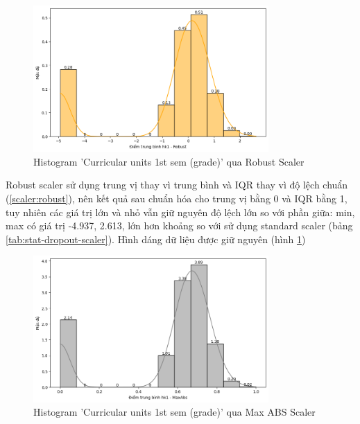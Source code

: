     \begin{figure}[htp]
        \centering
        \includegraphics[width=0.80\textwidth]{images/Table_Dropout_Grade_Robust.png}
        \caption{Histogram 'Curricular units 1st sem (grade)' qua Robust Scaler}
        \label{fig:Table_Dropout_Grade_Robust}
    \end{figure}

    \FloatBarrier

    Robust scaler sử dụng trung vị thay vì trung bình và IQR thay vì độ lệch chuẩn (\ref{scaler:robust}), nên kết quả sau chuẩn hóa cho trung vị bằng 0 và IQR bằng 1, tuy nhiên các giá trị lớn và nhỏ vẫn giữ nguyên độ lệch lớn so với phần giữa: min, max có giá trị -4.937, 2.613, lớn hơn khoảng so với sử dụng standard scaler (bảng \ref{tab:stat-dropout-scaler}). Hình dáng dữ liệu được giữ nguyên (hình \ref{fig:Table_Dropout_Grade_Robust})

    \begin{figure}[htp]
        \centering
        \includegraphics[width=0.80\textwidth]{images/Table_Dropout_Grade_MaxABS.png}
        \caption{Histogram 'Curricular units 1st sem (grade)' qua Max ABS Scaler}
        \label{fig:Table_Dropout_Grade_MaxABS}
    \end{figure}

